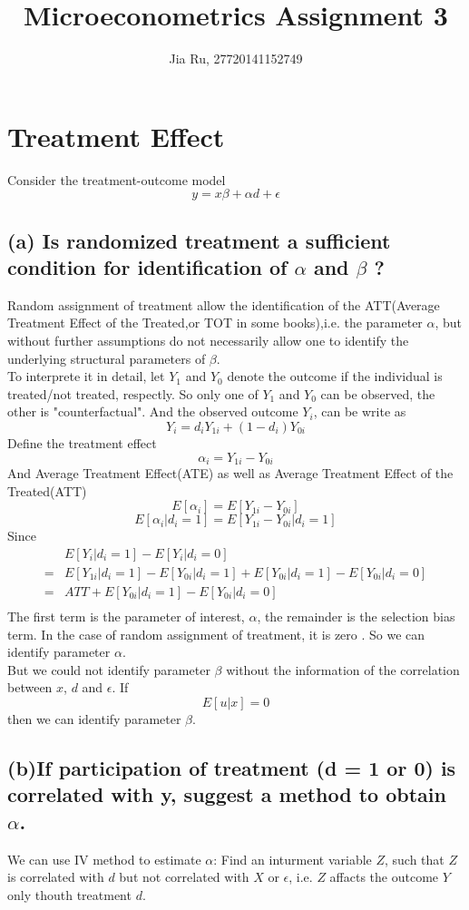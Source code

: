 \documentclass{article}
\begin{document}
	
	\title{Microeconometrics Assignment 3} 
	\author{Jia Ru, 27720141152749} 
	
	\maketitle
	
	
\section{Treatment Effect}
Consider the treatment-outcome model
$$ y = x\beta + \alpha d + \epsilon $$
\subsection*{(a) Is randomized treatment a sufficient condition for identification of $\alpha$ and $\beta$ ?}
Random assignment of treatment allow the identification of the ATT(Average Treatment Effect of the Treated,or TOT in some books),i.e. the parameter $\alpha$, but without further assumptions do not necessarily allow one to identify the underlying structural parameters of $\beta$.\\
To interprete it in detail, let $Y_1$ and $Y_0$ denote the outcome if the individual is treated/not treated, respectly. So only one of $Y_1$ and $Y_0$ can be observed, the other is "counterfactual". And the observed outcome $Y_i$, can be write as
$$ Y_i = d_iY_{1i} + (1-d_i)Y_{0i} $$
Define the treatment effect
$$ \alpha_i = Y_{1i}-Y_{0i} $$
And Average Treatment Effect(ATE) as well as Average Treatment Effect of the Treated(ATT)
$$ E[\alpha_i] = E[Y_{1i}-Y_{0i}] $$
$$ E[\alpha_i|d_i=1] = E[Y_{1i}-Y_{0i}|d_i=1] $$
Since
\begin{align*}
  & E[Y_i|d_i=1]-E[Y_i|d_i=0] \\
= & E[Y_{1i}|d_i=1]-E[Y_{0i}|d_i=1] + {E[Y_{0i}|d_i=1] - E[Y_{0i}|d_i=0]} \\
= & ATT+ E[Y_{0i}|d_i=1] - E[Y_{0i}|d_i=0] \\
\end{align*}
The first term is the parameter of interest, $\alpha$, the remainder is the selection bias term. In the case of random assignment of treatment, it is zero . So we can identify parameter $\alpha$. \\
But we could not identify parameter $\beta$ without the information of the correlation between $x$, $d$ and $\epsilon$. If 
$$ E[u|x]=0$$
then we can identify parameter $\beta$.

\subsection*{(b)If participation of treatment (d = 1 or 0) is correlated with y, suggest a method to obtain $\alpha$.}
We can use IV method to estimate $\alpha$: Find an inturment variable $Z$, such that $Z$ is correlated with $d$ but not correlated with $X$ or $\epsilon$, i.e. $Z$ affacts the outcome $Y$ only thouth treatment $d$.
\end{document}
